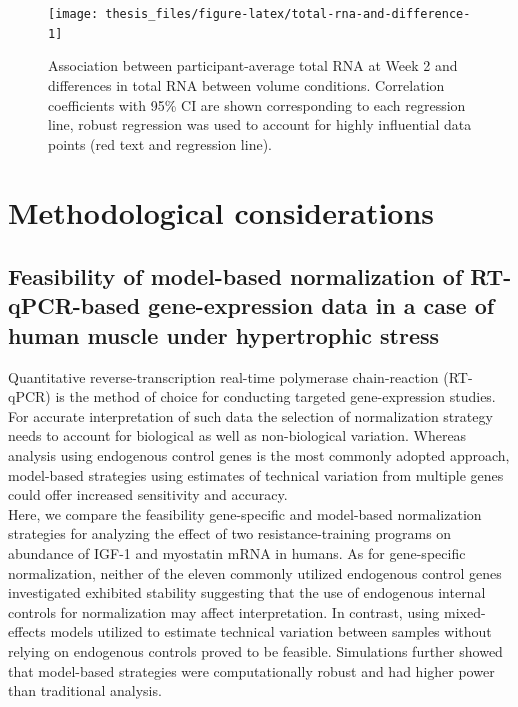 \documentclass[twoside,10pt]{gihclass} %
\begin{document}
\begin{figure}

{\centering \texttt{[image: thesis\_files/figure-latex/total-rna-and-difference-1]} 

}

\caption[Association between participant-average total RNA at Week 2 and differences in total RNA between volume conditions]{Association between participant-average total RNA at Week 2 and differences in total RNA between volume conditions. Correlation coefficients with 95\% CI are shown corresponding to each regression line, robust regression was used to account for highly influential data points (red text and regression line).}\label{fig:total-rna-and-difference}
\end{figure}
\hypertarget{methodological-considerations}{%
\chapter{Methodological considerations}\label{methodological-considerations}}

\hypertarget{feasibility-of-model-based-normalization-of-rt-qpcr-based-gene-expression-data-in-a-case-of-human-muscle-under-hypertrophic-stress}{%
\section{Feasibility of model-based normalization of RT-qPCR-based gene-expression data in a case of human muscle under hypertrophic stress}\label{feasibility-of-model-based-normalization-of-rt-qpcr-based-gene-expression-data-in-a-case-of-human-muscle-under-hypertrophic-stress}}

Quantitative reverse-transcription real-time polymerase chain-reaction (RT-qPCR) is the method of choice for conducting targeted gene-expression studies.
For accurate interpretation of such data the selection of normalization strategy needs to account for biological as well as non-biological variation.
Whereas analysis using endogenous control genes is the most commonly adopted approach, model-based strategies using estimates of technical variation from multiple genes could offer increased sensitivity and accuracy.\\
Here, we compare the feasibility gene-specific and model-based normalization strategies for analyzing the effect of two resistance-training programs on abundance of IGF-1 and myostatin mRNA in humans. As for gene-specific normalization, neither of the eleven commonly utilized endogenous control genes investigated exhibited stability suggesting that the use of endogenous internal controls for normalization may affect interpretation. In contrast, using mixed-effects models utilized to estimate technical variation between samples without relying on endogenous controls proved to be feasible.
Simulations further showed that model-based strategies were computationally robust and had higher power than traditional analysis.
\end{document}

